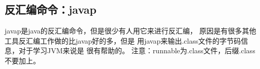\subsection[反汇编命令：javap]{反汇编命令：javap}
javap是java的反汇编命令，但是很少有人用它来进行反汇编，
原因是有很多其他工具反汇编工作做的比javap好的多，但是
用javap来输出.class文件的字节码信息，对于学习JVM来说是
很有帮助的。
注意：runnable为.class文件，后缀.class不要加上。